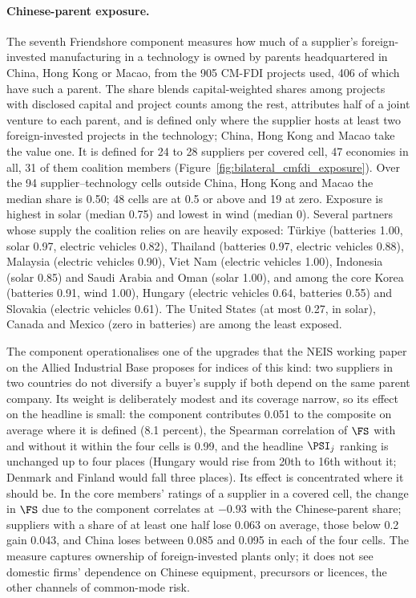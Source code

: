 \paragraph{Chinese-parent exposure.} The seventh Friendshore component measures how much of a
supplier's foreign-invested manufacturing in a technology is owned by parents headquartered in
China, Hong Kong or Macao, from the 905 CM-FDI projects used, 406 of which have such a parent. The
share blends capital-weighted shares among projects with disclosed capital and project counts
among the rest, attributes half of a joint venture to each parent, and is defined only where the
supplier hosts at least two foreign-invested projects in the technology; China, Hong Kong and Macao
take the value one. It is defined for 24 to 28 suppliers per covered cell, 47 economies in all, 31
of them coalition members (Figure~\ref{fig:bilateral_cmfdi_exposure}). Over the 94 supplier--technology
cells outside China, Hong Kong and Macao the median share is 0.50; 48 cells are at 0.5 or above and
19 at zero. Exposure is highest in solar (median 0.75) and lowest in wind (median 0). Several
partners whose supply the coalition relies on are heavily exposed: Türkiye (batteries 1.00, solar
0.97, electric vehicles 0.82), Thailand (batteries 0.97, electric vehicles 0.88), Malaysia
(electric vehicles 0.90), Viet Nam (electric vehicles 1.00), Indonesia (solar 0.85) and Saudi
Arabia and Oman (solar 1.00), and among the core Korea (batteries 0.91, wind 1.00), Hungary
(electric vehicles 0.64, batteries 0.55) and Slovakia (electric vehicles 0.61). The United States
(at most 0.27, in solar), Canada and Mexico (zero in batteries) are among the least exposed.

The component operationalises one of the upgrades that the NEIS working paper on the Allied
Industrial Base proposes for indices of this kind: two suppliers in two countries do not diversify
a buyer's supply if both depend on the same parent company. Its weight is deliberately modest and
its coverage narrow, so its effect on the headline is small: the component contributes 0.051 to
the composite on average where it is defined (8.1 percent), the Spearman correlation of $\FS$ with
and without it within the four cells is 0.99, and the headline $\PSI_j$ ranking is unchanged up to
four places (Hungary would rise from 20th to 16th without it; Denmark and Finland would fall three
places). Its effect is concentrated where it should be. In the core members' ratings of a supplier
in a covered cell, the change in $\FS$ due to the component correlates at $-0.93$ with the
Chinese-parent share; suppliers with a share of at least one half lose 0.063 on average, those
below 0.2 gain 0.043, and China loses between 0.085 and 0.095 in each of the four cells. The
measure captures ownership of foreign-invested plants only; it does not see domestic firms'
dependence on Chinese equipment, precursors or licences, the other channels of common-mode risk.

